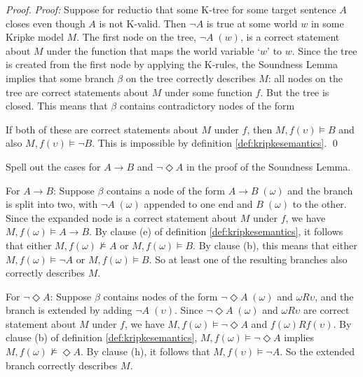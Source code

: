 \begin{proof}
  \emph{Proof:} Suppose for reductio that some K-tree for some target sentence
  $A$ closes even though $A$ is not K-valid. Then $\neg A$ is true at some world
  $w$ in some Kripke model $M$. The first node on the tree, $\neg A \; (w)$, is
  a correct statement about $M$ under the function that maps the world variable
  `$w$' to $w$. Since the tree is created from the first node by applying the
  K-rules, the Soundness Lemma implies that some branch $\beta$ on the tree
  correctly describes $M$: all nodes on the tree are correct statements about
  $M$ under some function $f$. But the tree is closed. This means that $\beta$
  contains contradictory nodes of the form
  
  \begin{center}
  \end{center}
  If both of these are correct statements about $M$ under $f$, then
  $M,f(\upsilon) \models B$ and also $M,f(\upsilon) \models \neg B$. This is
  impossible by definition \ref{def:kripkesemantics}. \qed
\end{proof}

\begin{exercise}
  Spell out the cases for $A \to B$ and $\neg\Diamond A$ in the proof of the
  Soundness Lemma.
\end{exercise}
\begin{solution}
  For $A\to B$: Suppose $\beta$ contains a node of the form $A \to B \;(\omega)$
  and the branch is split into two, with $\neg A \;(\omega)$ appended to one end
  and $B \;(\omega)$ to the other. Since the expanded node is a correct
  statement about $M$ under $f$, we have $M,f(\omega) \models A \to B$. By
  clause (e) of definition \ref{def:kripkesemantics}, it follows that either
  $M,f(\omega) \not\models A$ or $M,f(\omega) \models B$. By clause (b), this
  means that either $M,f(\omega) \models \neg A$ or $M,f(\omega) \models B$. So
  at least one of the resulting branches also correctly describes $M$.

  For $\neg\Diamond A$: Suppose $\beta$ contains nodes of the form
  $\neg\Diamond A \;(\omega)$ and $\omega R \upsilon$, and the branch is
  extended by adding $\neg A \;(\upsilon)$. Since $\neg\Diamond A \;(\omega)$
  and $\omega R \upsilon$ are correct statement about $M$ under $f$, we have
  $M,f(\omega) \models \neg\Diamond A$ and $f(\omega)Rf(\upsilon)$. By clause
  (b) of definition \ref{def:kripkesemantics},
  $M,f(\omega) \models \neg\Diamond A$ implies
  $M,f(\omega) \not\models \Diamond A$. By clause (h), it follows that
  $M,f(\upsilon) \models \neg A$. So the extended branch correctly describes
  $M$.
\end{solution}

